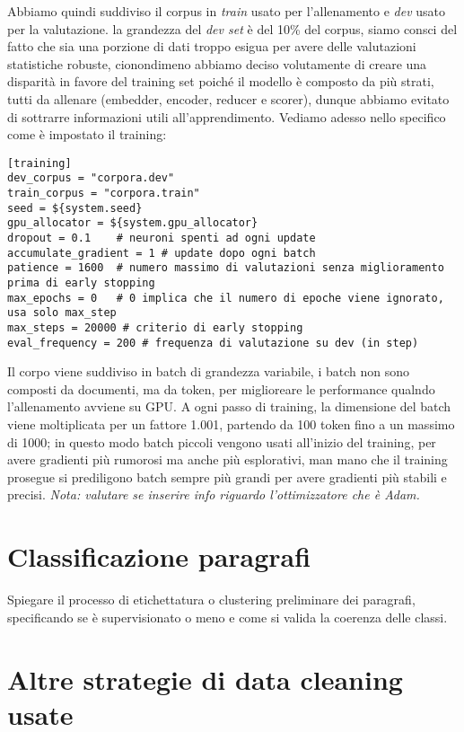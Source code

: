 \noindent Abbiamo quindi suddiviso il corpus in \textit{train} usato per l'allenamento e \textit{dev} usato per la valutazione. la grandezza del \textit{dev set} è del 10\% del corpus, siamo consci del fatto che sia una porzione di dati troppo esigua per avere delle valutazioni statistiche robuste, cionondimeno abbiamo deciso volutamente di creare una disparità in favore del training set poiché il modello è composto da più strati, tutti da allenare (embedder, encoder, reducer e scorer), dunque abbiamo evitato di sottrarre informazioni utili all'apprendimento. Vediamo adesso nello specifico come è impostato il training:

\begin{lstlisting}[style=cmd]
[training]
dev_corpus = "corpora.dev"
train_corpus = "corpora.train"
seed = ${system.seed}
gpu_allocator = ${system.gpu_allocator}
dropout = 0.1    # neuroni spenti ad ogni update
accumulate_gradient = 1 # update dopo ogni batch
patience = 1600  # numero massimo di valutazioni senza miglioramento prima di early stopping
max_epochs = 0   # 0 implica che il numero di epoche viene ignorato, usa solo max_step
max_steps = 20000 # criterio di early stopping
eval_frequency = 200 # frequenza di valutazione su dev (in step)
\end{lstlisting}

\noindent Il corpo viene suddiviso in batch di grandezza variabile, i batch non sono composti da documenti, ma da token, per miglioreare le performance qualndo l'allenamento avviene su GPU. A ogni passo di training, la dimensione del batch viene moltiplicata per un fattore 1.001, partendo da 100 token fino a un massimo di 1000; in questo modo batch piccoli vengono usati all'inizio del training, per avere gradienti più rumorosi ma anche più esplorativi, man mano che il training prosegue si prediligono batch sempre più grandi per avere gradienti più stabili e precisi. \textit{Nota: valutare se inserire info riguardo l'ottimizzatore che è Adam.}

\section{Classificazione paragrafi}
Spiegare il processo di etichettatura o clustering preliminare dei paragrafi, specificando se è supervisionato o meno e come si valida la coerenza delle classi.

\section{Altre strategie di data cleaning usate}
